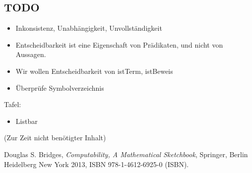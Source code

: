 \documentclass[a4paper]{amsart}
\theoremstyle{definition}
\begin{document}
\begin{backup}
\section{TODO}


 
\begin{itemize}
   \item Inkonsistenz, Unabhängigkeit, Unvollständigkeit
   \item Entscheidbarkeit ist eine Eigenschaft von Prädikaten, und nicht von Aussagen.
   \item Wir wollen Entscheidbarkeit von istTerm, istBeweis
\end{itemize}

\begin{itemize}
     \item Überprüfe Symbolverzeichnis
\end{itemize}

Tafel:
\begin{itemize}
   \item Listbar
\end{itemize}

\end{backup}

\begin{backup}
    (Zur Zeit nicht benötigter Inhalt)
\end{backup}

\begin{thebibliography}{9}
   Douglas S. Bridges, \emph{Computability, A Mathematical Sketchbook},
   Springer, Berlin Heidelberg New York 2013, ISBN 978-1-4612-6925-0 (ISBN).

\end{thebibliography}
\end{document}
